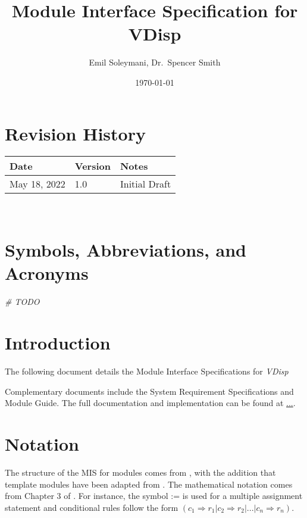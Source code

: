 \documentclass[12pt, titlepage]{article}
\begin{document}
\title{Module Interface Specification for VDisp}
\author{Emil Soleymani, Dr.~Spencer Smith}
\date{\today}
\maketitle

\section{Revision History}

\begin{tabularx}{\textwidth}{p{3cm}p{2cm}X}
\toprule {\bf Date} & {\bf Version} & {\bf Notes}\\
\midrule
May 18, 2022 & 1.0 & Initial Draft\\
\bottomrule
\end{tabularx}

~\newpage

\section{Symbols, Abbreviations, and Acronyms}
\emph{\# TODO}
\newpage

\tableofcontents

\newpage


\section{Introduction}

The following document details the Module Interface Specifications for \emph{VDisp}

Complementary documents include the System Requirement Specifications
and Module Guide.  The full documentation and implementation can be
found at \url{...}.  

\section{Notation}


The structure of the MIS for modules comes from \citet{HoffmanAndStrooper1995},
with the addition that template modules have been adapted from
\cite{GhezziEtAl2003}.  The mathematical notation comes from Chapter 3 of
\citet{HoffmanAndStrooper1995}.  For instance, the symbol := is used for a
multiple assignment statement and conditional rules follow the form $(c_1
\Rightarrow r_1 | c_2 \Rightarrow r_2 | ... | c_n \Rightarrow r_n )$.
\end{document}
